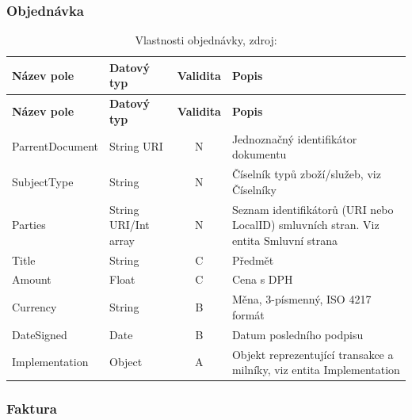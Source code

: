 \subsubsection*{Objednávka}

\begin{center}
\begin{longtable}{lp{20mm}cp{65mm}}
\label{grid_mlmmh} \\
\multicolumn{1}{l}{\textbf{Název pole}} & 
\multicolumn{1}{l}{\textbf{Datový typ}} & 
\multicolumn{1}{l}{\textbf{Validita}} & 
\multicolumn{1}{l}{\textbf{Popis}} \\ \hline 
\endfirsthead
\multicolumn{1}{l}{\textbf{Název pole}} & 
\multicolumn{1}{l}{\textbf{Datový typ}} & 
\multicolumn{1}{l}{\textbf{Validita}} & 
\multicolumn{1}{l}{\textbf{Popis}} \\ \hline 
\hline
\endhead
\endfoot
\caption[Vlastnosti objednávky]{Vlastnosti objednávky, zdroj:\cite{metodika, standard}}
\endlastfoot
ParrentDocument & String URI & N & Jednoznačný identifikátor dokumentu \\
SubjectType & String & N & Číselník typů zboží/služeb, viz Číselníky \\
Parties & String URI/Int array & N & Seznam identifikátorů (URI nebo LocalID) smluvních stran. Viz entita Smluvní strana \\
\rowcolor{validateC}Title & String & C & Předmět \\
\rowcolor{validateC}Amount & Float & C & Cena s DPH \\
\rowcolor{validateB}Currency & String & B & Měna, 3-písmenný, ISO 4217 formát \\
\rowcolor{validateB}DateSigned & Date & B & Datum posledního podpisu \\
\rowcolor{validateA}Implementation & Object & A & Objekt reprezentující transakce a milníky, viz entita Implementation \\
\end{longtable}
\end{center}

\subsubsection*{Faktura}

